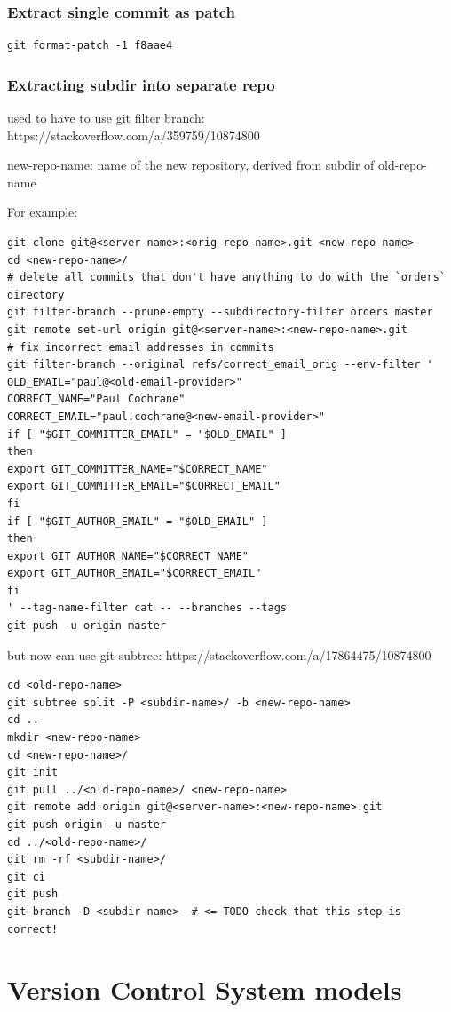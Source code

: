 \documentclass{git_course}
\begin{document}
\begin{frame}[fragile]
\frametitle{Extract single commit as patch}
\begin{lstlisting}
git format-patch -1 f8aae4
\end{lstlisting}
\end{frame}

\begin{frame}[fragile]
\frametitle{Extracting subdir into separate repo}
used to have to use git filter branch:
    https://stackoverflow.com/a/359759/10874800

    new-repo-name: name of the new repository, derived from subdir of
    old-repo-name

For example:
    \begin{lstlisting}
git clone git@<server-name>:<orig-repo-name>.git <new-repo-name>
cd <new-repo-name>/
# delete all commits that don't have anything to do with the `orders` directory
git filter-branch --prune-empty --subdirectory-filter orders master
git remote set-url origin git@<server-name>:<new-repo-name>.git
# fix incorrect email addresses in commits
git filter-branch --original refs/correct_email_orig --env-filter '
OLD_EMAIL="paul@<old-email-provider>"
CORRECT_NAME="Paul Cochrane"
CORRECT_EMAIL="paul.cochrane@<new-email-provider>"
if [ "$GIT_COMMITTER_EMAIL" = "$OLD_EMAIL" ]
then
export GIT_COMMITTER_NAME="$CORRECT_NAME"
export GIT_COMMITTER_EMAIL="$CORRECT_EMAIL"
fi
if [ "$GIT_AUTHOR_EMAIL" = "$OLD_EMAIL" ]
then
export GIT_AUTHOR_NAME="$CORRECT_NAME"
export GIT_AUTHOR_EMAIL="$CORRECT_EMAIL"
fi
' --tag-name-filter cat -- --branches --tags
git push -u origin master
    \end{lstlisting}

but now can use git subtree:
    https://stackoverflow.com/a/17864475/10874800

\begin{lstlisting}
cd <old-repo-name>
git subtree split -P <subdir-name>/ -b <new-repo-name>
cd ..
mkdir <new-repo-name>
cd <new-repo-name>/
git init
git pull ../<old-repo-name>/ <new-repo-name>
git remote add origin git@<server-name>:<new-repo-name>.git
git push origin -u master
cd ../<old-repo-name>/
git rm -rf <subdir-name>/
git ci
git push
git branch -D <subdir-name>  # <= TODO check that this step is correct!
\end{lstlisting}
\end{frame}

\appendix

\section{Version Control System models}
\end{document}
